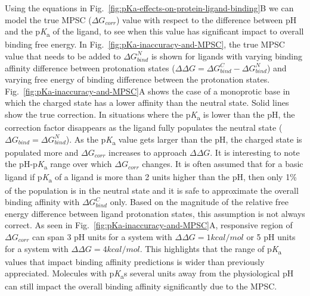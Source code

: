 \documentclass[9pt,lineno,final]{elife}
\newcommand{\pKa}{p\textit{K}\textsubscript{a}}
\begin{document}
Using the equations in Fig.~\ref{fig:pKa-effects-on-protein-ligand-binding}B we can model the true MPSC ($\Delta G_{corr}$) value with respect to the difference between pH and the \pKa{} of the ligand, to see when this value has significant impact to overall binding free energy. In Fig.~\ref{fig:pKa-inaccuracy-and-MPSC}, the true MPSC value that needs to be added to $\Delta G_{bind}^{N}$ is shown for ligands with varying binding affinity difference between protonation states ($\Delta\Delta G = \Delta G_{bind}^{C} - \Delta G_{bind}^{N}$) and varying free energy of binding difference between the protonation states. Fig.~\ref{fig:pKa-inaccuracy-and-MPSC}A shows the case of a monoprotic base in which the charged state has a lower affinity than the neutral state. Solid lines show the true correction. In situations where the \pKa{} is lower than the pH, the correction factor disappears as the ligand fully populates the neutral state ($\Delta G_{bind} = \Delta G_{bind}^{N}$). As the \pKa{} value gets larger than the pH, the charged state is populated more and $\Delta G_{corr}$ increases to approach $\Delta\Delta G$. 
It is interesting to note the pH-\pKa{} range over which $\Delta G_{corr}$ changes.
It is often assumed that for a basic ligand if \pKa{} of a ligand is more than 2 units higher than the pH, then only 1\% of the population is in the neutral state and it is safe to approximate the overall binding affinity with $\Delta G_{bind}^{C}$ only. Based on the magnitude of the relative free energy difference between ligand protonation states, this assumption is not always correct. As seen in Fig.~\ref{fig:pKa-inaccuracy-and-MPSC}A, responsive region of $\Delta G_{corr}$ can span 3 pH units for a system with $\Delta\Delta G = 1 kcal/mol$  or 5 pH units for a system with $\Delta\Delta G = 4 kcal/mol$. This highlights that the range of \pKa{} values that impact binding affinity predictions is wider than previously appreciated. Molecules with \pKa{}s several units away from the physiological pH can still impact the overall binding affinity significantly due to the MPSC. 
\end{document}

